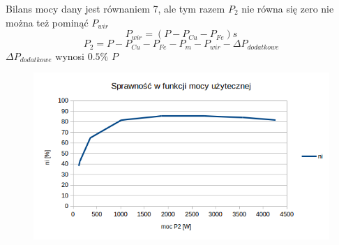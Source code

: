 \documentclass[12pt]{article}
\begin{document}
Bilans mocy dany jest równaniem 7, ale tym razem $P_2$ nie równa się zero nie można też pominąć $P_{wir}$
\begin{equation}
	P_{wir}=(P-P_{Cu}-P_{Fe})s
\end{equation}
\begin{equation}
	P_2=P-P_{Cu}-P_{Fe}-P_{m}-P_{wir}-\Delta P_{dodatkowe}
\end{equation}	
$\Delta P_{dodatkowe}$ wynosi $0.5\%$ $P$
\nopagebreak
	\begin{figure}[H]
			\centering
			\includegraphics[width=12 cm]{wykresy/ch_obciazeniowa}
	\end{figure}
\end{document}
